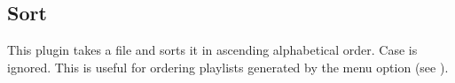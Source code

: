 \subsection{Sort}
This plugin takes a file and sorts it in ascending alphabetical order.  Case is
ignored.  This is useful for ordering playlists generated by the 
 menu option (see ).


